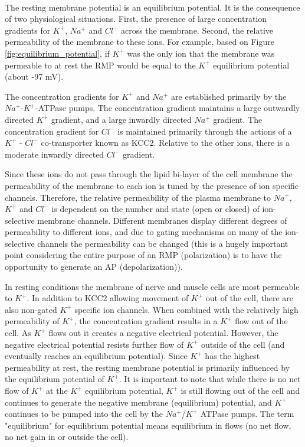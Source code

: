 \paragraph{}
The resting membrane potential is an equilibrium potential. It is the consequence of two physiological situations. First, the presence of large concentration gradients for $K^+$, $Na^+$  and $Cl^-$ across the membrane. Second, the relative permeability of the membrane to these ions. For example, based on Figure \ref{fig:equilibrium_potential}, if $K^+$ was the only ion that the membrane was permeable to at rest the RMP would be equal to the $K^+$ equilibrium potential (about -97 mV).

The concentration gradients for $K^+$ and $Na^+$ are established primarily by the $Na^+$-$K^+$-ATPase pumps. The concentration gradient maintains a large outwardly directed $K^+$ gradient, and a large inwardly directed $Na^+$ gradient. The concentration gradient for $Cl^-$ is maintained primarily through the actions of a $K^+$ - $Cl^-$ co-transporter known as KCC2. Relative to the other ions, there is a moderate inwardly directed $Cl^-$ gradient.


Since these ions do not pass through the lipid bi-layer of the cell membrane the permeability of the membrane to each ion is tuned by the presence of ion specific channels. Therefore, the relative permeability of the plasma membrane to $Na^+$, $K^+$ and $Cl^-$ is dependent on the number and state (open or closed) of ion-selective membrane channels. Different membranes display different degrees of permeability to different ions, and due to gating mechanisms on many of the ion-selective channels the permeability can be changed (this is a hugely important point considering the entire purpose of an RMP (polarization) is to have the opportunity to generate an AP (depolarization)).

In resting conditions the membrane of nerve and muscle cells are most permeable to $K^+$. In addition to KCC2 allowing movement of $K^+$ out of the cell, there are also non-gated $K^+$ specific ion channels. When combined with the relatively high permeability of $K^+$, the concentration gradient results in a $K^+$ flow out of the cell. As $K^+$ flows out it creates a negative electrical potential. However, the negative electrical potential resists further flow of $K^+$ outside of the cell (and eventually reaches an equilibrium potential). Since $K^+$ has the highest permeability at rest, the resting membrane potential is primarily influenced by the equilibrium potential of $K^+$. It is important to note that while there is no net flow of $K^+$ at the $K^+$ equilibrium potential, $K^+$ is still flowing out of the cell and continues to generate the negative membrane (equilibrium) potential, and $K^+$ continues to be pumped into the cell by the $Na^+$/$K^+$ ATPase pumps. The term "equilibrium" for equilibrium potential means equilibrium in flows (no net flow, no net gain in or outside the cell).

